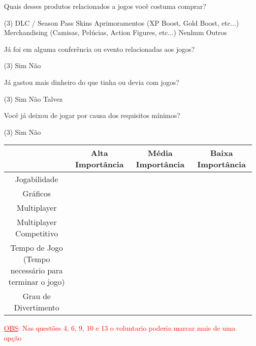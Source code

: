 \documentclass[11pt,a4paper]{article}
\begin{document}
\begin{question}
	Quais desses produtos relacionados a jogos você costuma comprar?
	\begin{tasks}(3)
	\task DLC / Season Pass
	\task Skins
	\task Aprimoramentos (XP Boost, Gold Boost, etc...)
	\task Merchandising (Camisas, Pelúcias, Action Figures, etc...)
	\task Nenhum
	\task Outros
	\end{tasks}
\end{question}
\begin{question}
 Já foi em alguma conferência ou evento relacionadas aos jogos?
	\begin{tasks}(3)
	\task Sim
	\task Não
	\end{tasks}
\end{question}

\begin{question}
	Já gastou mais dinheiro do que tinha ou devia com jogos?
	\begin{tasks}(3)
	\task Sim
	\task Não 
	\task Talvez
	\end{tasks}
\end{question}

\begin{question}
	Você já deixou de jogar por causa dos requisitos mínimos?
	\begin{tasks}(3)
	\task Sim
	\task Não
	\end{tasks}
\end{question}

\begin{question}
\begin{center}
  \begin{tabular}{| c | c | c | c | }
    \hline
    & Alta Importância & Média Importância & Baixa Importância\\ 
    \hline
    \hline
    Jogabilidade & & & \\ \hline
	Gráficos  & & &\\
    \hline
    Multiplayer & & & \\
    \hline
    Multiplayer Competitivo & & & \\
    \hline
    \makecell{	Tempo de Jogo (Tempo \\ necessário para terminar o jogo)}  & & &\\
    \hline
    Grau de Divertimento & & & \\
    \hline
  \end{tabular}
\end{center}
\end{question}
\textcolor{red}{\underline{OBS}: Nas questões 4, 6, 9, 10 e 13 o voluntario poderia marcar mais de uma opção}
\end{document}
